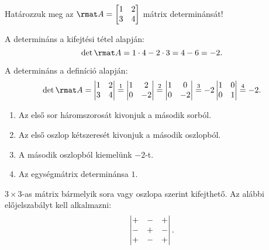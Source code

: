\documentclass[a4paper, 12pt]{scrartcl}
\begin{document}
\begin{example}
  Határozzuk meg az $\rmat A = \begin{bmatrix}
      1 & 2 \\
      3 & 4
    \end{bmatrix}$ mátrix determinánsát!

  A determináns a kifejtési tétel alapján:
  $$
    \det \rmat A
    = 1 \cdot 4 - 2 \cdot 3
    = 4 - 6
    = -2
    \text.
  $$

  A determináns a definíció alapján:
  $$
    \det \rmat A
    = \begin{vmatrix}
      1 & 2 \\
      3 & 4
    \end{vmatrix}
    \overset{1}{=} \begin{vmatrix}
      1 & 2  \\
      0 & -2
    \end{vmatrix}
    \overset{2}{=} \begin{vmatrix}
      1 & 0  \\
      0 & -2
    \end{vmatrix}
    \overset{3}{=} -2 \begin{vmatrix}
      1 & 0 \\
      0 & 1
    \end{vmatrix}
    \overset{4}{=} -2
    \text.
  $$
  \begin{enumerate}
    \item Az első sor háromszorosát kivonjuk a második sorból.
    \item Az első oszlop kétszeresét kivonjuk a második oszlopból.
    \item A második oszlopból kiemelünk $-2$-t.
    \item Az egységmátrix determinánsa $1$.
  \end{enumerate}
\end{example}

\begin{note}
  $3 \times 3$-as mátrix bármelyik sora vagy oszlopa szerint kifejthető.
  Az alábbi előjelszabályt kell alkalmazni:
  $$
    \begin{vmatrix}
      + & - & + \\
      - & + & - \\
      + & - & +
    \end{vmatrix}
    \text.
  $$
\end{note}
\end{document}
